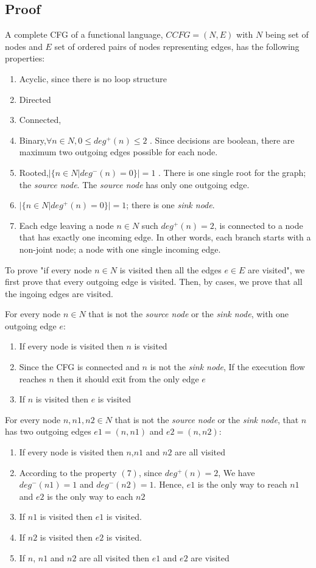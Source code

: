 \subsection{Proof}
A complete CFG of a functional language, $CCFG = (N,E)$ with $N$ being set of nodes and $E$ set of ordered pairs of nodes representing edges, has the following properties:

\begin{enumerate}
 \item Acyclic, since there is no loop structure
 \item Directed
 \item Connected,
 \item Binary,$\forall n \in N, 0\leq deg^+(n)\leq2 $ . Since decisions are boolean, there are maximum two outgoing edges possible for each node.
 \item Rooted,$|\{n\in N |deg^-(n)=0\} | = 1$ . There is one single root for the graph; the \emph{source node}. The \emph{source node} has only one outgoing edge.
 \item $|\{n\in N |deg^+(n)=0\} | = 1$; there is one \emph{sink node}.
 \item Each edge leaving a node $n \in N$ such $deg^+(n)=2$, is connected to a node that has exactly one incoming edge. In other words, each branch starts with a non-joint node; a node with one single incoming edge.

\end{enumerate}

To prove "if every node $n \in N$ is visited then all the edges $e \in E$ are visited", we first prove that every outgoing edge is visited. Then, by cases, we prove that all the ingoing edges are visited.

For every node $n \in N$ that is not the \emph{source node} or the \emph{sink node}, with one outgoing edge $e$:
\begin{enumerate}
 \item If every node is visited then $n$ is visited 
 \item Since the CFG is connected and $n$ is not the \emph{sink node}, If the execution flow reaches $n$ then it should exit from the only edge $e$
 \item If $n$ is visited then $e$ is visited
\end{enumerate}

For every node $n,n1,n2 \in N$ that is not the \emph{source node} or the \emph{sink node}, that $n$ has two outgoing edges $e1=(n,n1)$ and $e2=(n,n2)$:
\begin{enumerate}
 \item If every node is visited then $n$,$n1$ and $n2$ are all visited 
 \item According to the property $(7)$, since $deg^+(n)=2$, We have $deg^-(n1)=1$ and $deg^-(n2)=1$. Hence, $e1$ is the only way to reach $n1$ and $e2$ is the only way to each $n2$
 \item If $n1$ is visited then $e1$ is visited.
 \item If $n2$ is visited then $e2$ is visited.
 \item If $n$, $n1$ and $n2$ are all visited then $e1$ and $e2$ are visited
\end{enumerate}


